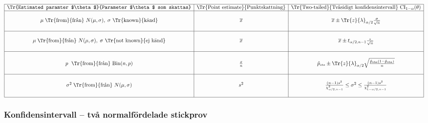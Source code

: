 \documentclass[a4paper]{article}
\def\obs{{\mbox{\tiny obs}}}
\def\CI{\mbox{CI}}
\newcommand\conj[1]{{\overline #1}}
\let\ob\conj
\begin{document}
\begin{eqnarray*}\begin{array}{|c|c|c|}\hline
     \mbox{\Tr{Estimated paramter $\theta$}{Parameter $\theta$ som skattas}}
   & \mbox{\Tr{Point estimate}{Punktskattning}}
   & \mbox{\Tr{Two-tailed}{Tvåsidigt konfidensintervall} }
   \CI_{1-\alpha}(\theta) \\

\hline && \\
\mu \;\mbox{\Tr{from}{från} } N(\mu,\sigma),\; \sigma \mbox{ \Tr{known}{känd}}
 & \overline{x}
 &  \ob x \pm \Tr{z}{\lambda}_{\alpha/2}\frac{\sigma}{\sqrt{n}}\\&&\\

\hline &&\\
\mu \;\mbox{\Tr{from}{från} } N(\mu,\sigma),\; \sigma \mbox{ \Tr{not known}{ej känd}}
 & \overline{x}
& \ob x \pm t_{\alpha/2,n-1}\frac{s}{\sqrt{n}}\\&&\\

\hline &&\\p \;\mbox{ \Tr{from}{från} Bin}(n,p) & \frac xn
& \hat p_\obs\pm
\Tr{z}{\lambda}_{\alpha/2}\sqrt{\frac{\hat p_\obs(1-\hat p_\obs)}{n}}

\\&&\\

\hline &&\\
\sigma^2 \;\mbox{\Tr{from}{från} } N(\mu,\sigma)
 & s^2&\frac{(n-1)s^2}{\chi^2_{\alpha/2,n-1}}
  \leq\sigma^2
  \leq \frac{(n-1)s^2}{\chi^2_{1-\alpha/2,n-1}}

 \\&&\\
\hline

  \end{array}
\end{eqnarray*}

\subsubsection*{%
                   {Konfidensintervall -- två normalfördelade stickprov}}
\end{document}
